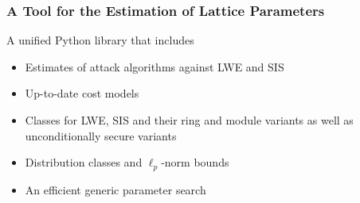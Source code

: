 \documentclass[t, aspectratio=169]{beamer}
\begin{document}
\begin{frame}
    \frametitle{A Tool for the Estimation of Lattice Parameters}
    A unified Python library that includes\pause
    \begin{itemize}[<+->]
        \item Estimates of attack algorithms against LWE and SIS
        \item Up-to-date cost models
        \item Classes for LWE, SIS and their ring and module variants as well as unconditionally secure variants
        \item Distribution classes and $\ell_p$-norm bounds %
        \item An efficient generic parameter search
    \end{itemize}
\end{frame}
\end{document}
